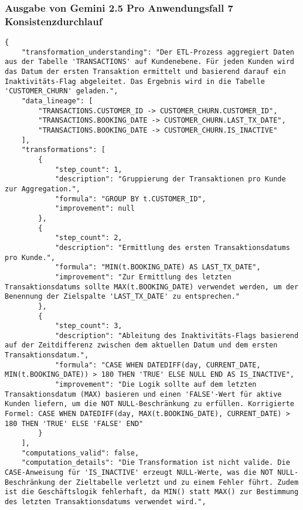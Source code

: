 \subsubsection{Ausgabe von Gemini 2.5 Pro Anwendungsfall 7 Konsistenzdurchlauf}\label{anhang:subsubsec:gemini_case7_prompt2}
\begin{lstlisting}[caption={Ausgabe: Gemini 2.5 Pro Anwendungsfall 7 Konsistenzdurchlauf},label={gemini_case7_prompt2}]
{
    "transformation_understanding": "Der ETL-Prozess aggregiert Daten aus der Tabelle 'TRANSACTIONS' auf Kundenebene. Für jeden Kunden wird das Datum der ersten Transaktion ermittelt und basierend darauf ein Inaktivitäts-Flag abgeleitet. Das Ergebnis wird in die Tabelle 'CUSTOMER_CHURN' geladen.",
    "data_lineage": [
        "TRANSACTIONS.CUSTOMER_ID -> CUSTOMER_CHURN.CUSTOMER_ID",
        "TRANSACTIONS.BOOKING_DATE -> CUSTOMER_CHURN.LAST_TX_DATE",
        "TRANSACTIONS.BOOKING_DATE -> CUSTOMER_CHURN.IS_INACTIVE"
    ],
    "transformations": [
        {
            "step_count": 1,
            "description": "Gruppierung der Transaktionen pro Kunde zur Aggregation.",
            "formula": "GROUP BY t.CUSTOMER_ID",
            "improvement": null
        },
        {
            "step_count": 2,
            "description": "Ermittlung des ersten Transaktionsdatums pro Kunde.",
            "formula": "MIN(t.BOOKING_DATE) AS LAST_TX_DATE",
            "improvement": "Zur Ermittlung des letzten Transaktionsdatums sollte MAX(t.BOOKING_DATE) verwendet werden, um der Benennung der Zielspalte 'LAST_TX_DATE' zu entsprechen."
        },
        {
            "step_count": 3,
            "description": "Ableitung des Inaktivitäts-Flags basierend auf der Zeitdifferenz zwischen dem aktuellen Datum und dem ersten Transaktionsdatum.",
            "formula": "CASE WHEN DATEDIFF(day, CURRENT_DATE, MIN(t.BOOKING_DATE)) > 180 THEN 'TRUE' ELSE NULL END AS IS_INACTIVE",
            "improvement": "Die Logik sollte auf dem letzten Transaktionsdatum (MAX) basieren und einen 'FALSE'-Wert für aktive Kunden liefern, um die NOT NULL-Beschränkung zu erfüllen. Korrigierte Formel: CASE WHEN DATEDIFF(day, MAX(t.BOOKING_DATE), CURRENT_DATE) > 180 THEN 'TRUE' ELSE 'FALSE' END"
        }
    ],
    "computations_valid": false,
    "computation_details": "Die Transformation ist nicht valide. Die CASE-Anweisung für 'IS_INACTIVE' erzeugt NULL-Werte, was die NOT NULL-Beschränkung der Zieltabelle verletzt und zu einem Fehler führt. Zudem ist die Geschäftslogik fehlerhaft, da MIN() statt MAX() zur Bestimmung des letzten Transaktionsdatums verwendet wird.",

\end{lstlisting}
